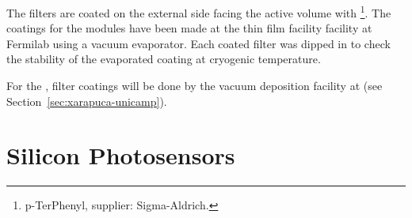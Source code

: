 The filters are coated on the external side facing the \lar active volume with \footnote{p-TerPhenyl, supplier: Sigma-Aldrich\textregistered.}.  The coatings for the  modules have been made at the thin film facility facility at Fermilab using a vacuum evaporator. Each coated filter was dipped in  to check the stability of the evaporated coating at cryogenic temperature. 


For the , filter coatings will be done by the vacuum deposition facility at  (see Section~\ref{sec:xarapuca-unicamp}).







\section{Silicon Photosensors}
\label{sec:fdsp-pd-ps}

